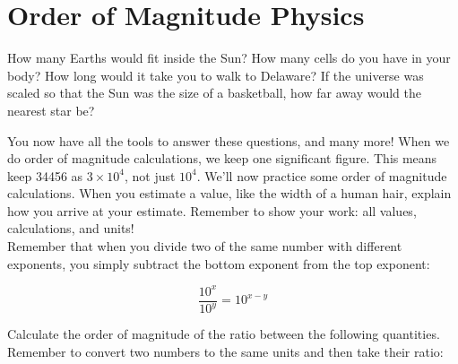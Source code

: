 \documentclass[12pt]{article}
\begin{document}
\section*{Order of Magnitude Physics}

How many Earths would fit inside the Sun? How many cells do you have in your body? How long would it take you to walk to Delaware? If the universe was scaled so that the Sun was the size of a basketball, how far away would the nearest star be?

You now have all the tools to answer these questions, and many more! When we do order of magnitude calculations, we keep one significant figure. This means keep 34456 as ${3 \times 10^4}$, not just $10^4$. We'll now practice some order of magnitude calculations. When you estimate a value, like the width of a human hair, explain how you arrive at your estimate. Remember to show your work: all values, calculations, and units!\\

Remember that when you divide two of the same number with different exponents, you simply subtract the bottom exponent from the top exponent:

\begin{equation}
\frac{10^x}{10^y} = 10^{x-y}
\end{equation}

Calculate the order of magnitude of the ratio between the following quantities. Remember to convert two numbers to the same units and then take their ratio: 
\end{document}
